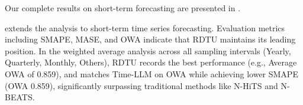 Our complete results on short-term forecasting are presented in .

 extends the analysis to short-term time series forecasting. Evaluation metrics including SMAPE, MASE, and OWA indicate that RDTU maintains its leading position. In the weighted average analysis across all sampling intervals (Yearly, Quarterly, Monthly, Others), RDTU records the best performance (e.g., Average OWA of 0.859), and matches Time-LLM on OWA while achieving lower SMAPE (OWA 0.859), significantly surpassing traditional methods like N-HiTS and N-BEATS.


